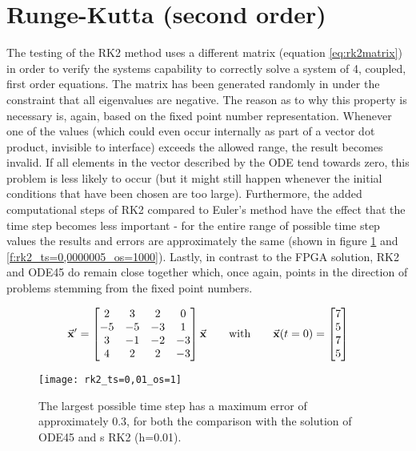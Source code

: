 \section{Runge-Kutta (second order)}
The testing of the RK2 method uses a different matrix (equation \ref{eq:rk2matrix}) in order to verify the systems capability to correctly solve a system of 4, coupled, first order equations. The matrix has been generated randomly in \matlab{} under the constraint that all eigenvalues are negative. The reason as to why this property is necessary is, again, based on the fixed point number representation. Whenever one of the values (which could even occur internally as part of a vector dot product, invisible to interface) exceeds the allowed range, the result becomes invalid. If all elements in the vector described by the ODE tend towards zero, this problem is less likely to occur (but it might still happen whenever the initial conditions that have been chosen are too large). Furthermore, the added computational steps of RK2 compared to Euler's method have the effect that the time step becomes less important - for the entire range of possible time step values the results and errors are approximately the same (shown in figure \ref{f:rk2_ts=0,01_os=1} and \ref{f:rk2_ts=0,0000005_os=1000}). Lastly, in contrast to the FPGA solution, \matlab{} RK2 and ODE45 do remain close together which, once again, points in the direction of problems stemming from the fixed point numbers.

\begin{equation}
\label{eq:rk2matrix}
\vec{\mathbf{x}}' = \begin{bmatrix} 
2 & 3 & 2 & 0 \\
-5 & -5 & -3 & 1 \\
3 & -1 & -2 & -3 \\
4 & 2 & 2 & -3 \\
\end{bmatrix} \vec{\mathbf{x}} 
\hspace{20pt} \text{with} \hspace{20pt} 
\vec{\mathbf{x}}(t = 0) =\begin{bmatrix} 7 \\ 5 \\ 7 \\ 5 \end{bmatrix} 
\end{equation}

\begin{figure}[p]
	\centering
	\texttt{[image: rk2\_ts=0,01\_os=1]}
	\caption{The largest possible time step has a maximum error of approximately 0.3, for both the comparison with the solution of ODE45 and \matlab{}s RK2 (h=0.01).}
	\label{f:rk2_ts=0,01_os=1}
\end{figure}


